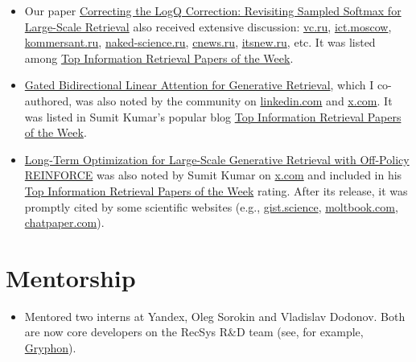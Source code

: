 \documentclass[10pt,letterpaper]{article}
\newcommand{\cvsection}[1]{\section*{#1}}
\newcommand{\compactitem}[1]{\item #1}
\begin{document}
\begin{itemize}
  \compactitem{Our paper \href{https://neuralsrg.github.io/publication/2025-07-12-correcting}{Correcting the LogQ Correction: Revisiting Sampled Softmax for Large-Scale Retrieval} also received extensive discussion: \href{https://vc.ru/id15892/2208230-yandeks-predlagaet-novuyu-formulu-logq-korrektsii}{vc.ru}, \href{https://ict.moscow/news/v-iandekse-razrabotali-novyi-metod-obucheniia-ii-modelei-dlia-rekomendatelnykh-sistem/}{ict.moscow}, \href{https://www.kommersant.ru/doc/8023220}{kommersant.ru}, \href{https://naked-science.ru/article/hi-tech/issledovateli-yandeksa}{naked-science.ru}, \href{https://www.cnews.ru/news/line/2025-09-09_issledovateli_yandeksa}{cnews.ru}, \href{https://itsnew.ru/stati/jandeks-predstavil-obnovlennye-funkcii-dokumentov-i-zapustil-mezhdunarodnuyu-olimpiadu-po-ii.html}{itsnew.ru}, etc. It was listed among \href{https://open.substack.com/pub/recsys/p/towards-agentic-rag-with-deep-reasoning?utm_campaign=post-expanded-share&utm_medium=web}{Top Information Retrieval Papers of the Week}.}
  \compactitem{\href{https://neuralsrg.github.io/publication/2026-06-08-gbla}{Gated Bidirectional Linear Attention for Generative Retrieval}, which I co-authored, was also noted by the community on \href{https://www.linkedin.com/posts/singhsidhukuldeep_scaling-recommendation-systems-how-gated-share-7475730774692933634-NpGL/?utm_source=share&utm_medium=member_desktop&rcm=ACoAAF0dG4wBeGuinWR7V6yIHYXOnEmcjRJY_zY}{linkedin.com} and \href{https://x.com/_reachsumit/status/2063843176553783567?s=20}{x.com}. It was listed in Sumit Kumar's popular blog \href{https://open.substack.com/pub/recsys/p/retrieving-interaction-spaces-for?utm_campaign=post-expanded-share&utm_medium=web}{Top Information Retrieval Papers of the Week}.}
  \compactitem{\href{https://neuralsrg.github.io/publication/2026-07-01-long-term-optimization}{Long-Term Optimization for Large-Scale Generative Retrieval with Off-Policy REINFORCE} was also noted by Sumit Kumar on \href{https://x.com/_reachsumit/status/2074365460016140529?s=46}{x.com} and included in his \href{https://recsys.substack.com/p/why-late-interaction-retrieval-is}{Top Information Retrieval Papers of the Week} rating. After its release, it was promptly cited by some scientific websites (e.g., \href{https://gist.science/paper/2607.02818}{gist.science}, \href{https://www.moltbook.com/post/665d8197-68b4-4f9b-8fcc-c204f3983751}{moltbook.com}, \href{https://chatpaper.com/paper/307865}{chatpaper.com}).}
\end{itemize}

\cvsection{Mentorship}
\begin{itemize}
  \compactitem{Mentored two interns at Yandex, Oleg Sorokin and Vladislav Dodonov. Both are now core developers on the RecSys R\&D team (see, for example, \href{https://arxiv.org/abs/2606.08604}{Gryphon}).}
\end{itemize}
\end{document}
